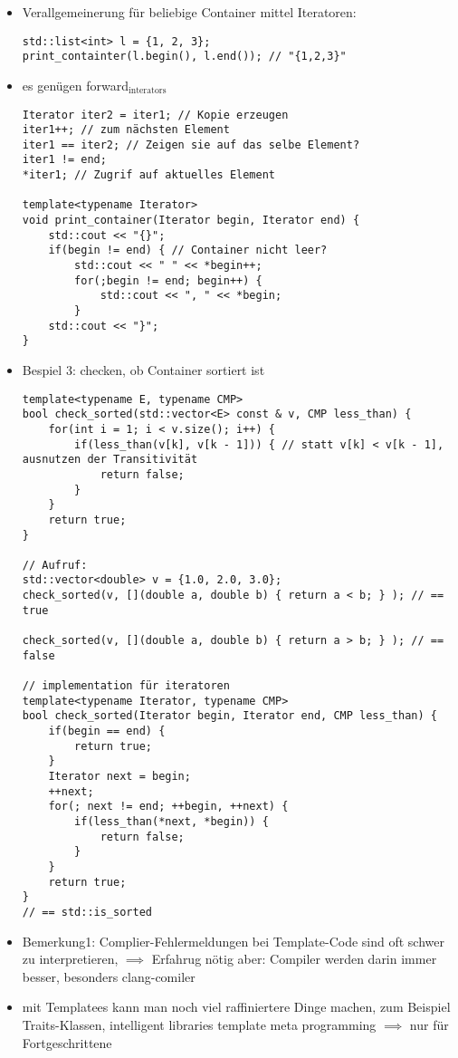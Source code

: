 \documentclass[a4paper]{scrartcl}
\begin{document}
$$\begin{itemize}
\begin{enumerate}
\begin{itemize}
\begin{itemize}
\begin{verbatim}
		for(int i = 1; i < v.size(); i++) {
			std::cout << ", " << v[i];
		}
	}
	std::cout << " }";
}
\end{verbatim}
\item Verallgemeinerung für beliebige Container mittel Iteratoren:
\begin{verbatim}
std::list<int> l = {1, 2, 3};
print_containter(l.begin(), l.end()); // "{1,2,3}"
\end{verbatim}
\item es genügen forward$_{\text{interators}}$
\begin{verbatim}
Iterator iter2 = iter1; // Kopie erzeugen
iter1++; // zum nächsten Element
iter1 == iter2; // Zeigen sie auf das selbe Element?
iter1 != end;
*iter1; // Zugrif auf aktuelles Element

template<typename Iterator>
void print_container(Iterator begin, Iterator end) {
	std::cout << "{}";
	if(begin != end) { // Container nicht leer?
		std::cout << " " << *begin++;
		for(;begin != end; begin++) {
			std::cout << ", " << *begin;
		}
	std::cout << "}";
}
\end{verbatim}
\item Bespiel 3: checken, ob Container sortiert ist
\begin{verbatim}
template<typename E, typename CMP>
bool check_sorted(std::vector<E> const & v, CMP less_than) {
	for(int i = 1; i < v.size(); i++) {
		if(less_than(v[k], v[k - 1])) { // statt v[k] < v[k - 1], ausnutzen der Transitivität
			return false;
		}
	}
	return true;
}

// Aufruf:
std::vector<double> v = {1.0, 2.0, 3.0};
check_sorted(v, [](double a, double b) { return a < b; } ); // == true

check_sorted(v, [](double a, double b) { return a > b; } ); // == false

// implementation für iteratoren
template<typename Iterator, typename CMP>
bool check_sorted(Iterator begin, Iterator end, CMP less_than) {
	if(begin == end) {
		return true;
	}
	Iterator next = begin;
	++next;
	for(; next != end; ++begin, ++next) {
		if(less_than(*next, *begin)) {
			return false;
		}
	}
	return true;
}
// == std::is_sorted
\end{verbatim}
\item Bemerkung1: Complier-Fehlermeldungen bei Template-Code sind oft schwer zu interpretieren, $\implies$ Erfahrug nötig aber: Compiler werden darin immer besser, besonders clang-comiler
\item mit Templatees kann man noch viel raffiniertere Dinge machen, zum Beispiel Traits-Klassen, intelligent libraries template meta programming $\implies$ nur für Fortgeschrittene
\end{itemize}
\end{itemize}
\end{enumerate}
\end{itemize}
\end{document}
